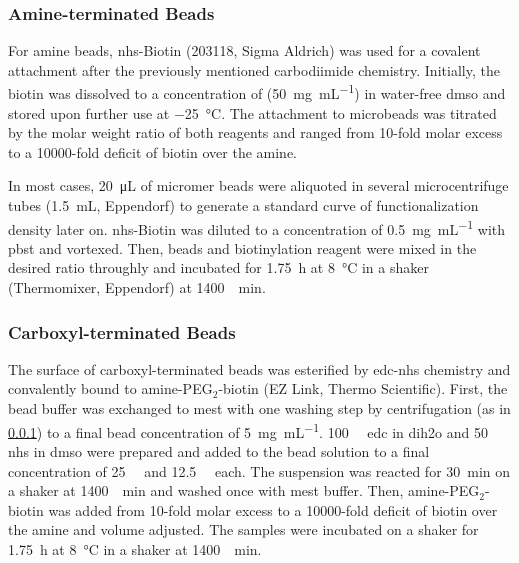 \subsubsection{Amine-terminated Beads} \label{sec:meth:aminebeads}
For \gls{amine} beads, \gls{nhs}-Biotin (203118, Sigma Aldrich) was used for a covalent attachment after the previously mentioned carbodiimide chemistry. Initially, the biotin was dissolved to a concentration of (\SI{50}{\milli\gram\per\milli\liter}) in water-free \gls{dmso} and stored upon further use at \SI{-25}{\degreeCelsius}. The attachment to microbeads was titrated by the molar weight ratio of both reagents and ranged from 10-fold molar excess to a \num{10000}-fold deficit of biotin over the amine. 

In most cases, \SI{20}{\micro\liter} of micromer beads were aliquoted in several microcentrifuge tubes (\SI{1.5}{\milli\liter}, Eppendorf) to generate a standard curve of functionalization density later on. \gls{nhs}-Biotin was diluted to a concentration of \SI{0.5}{\milli\gram\per\milli\liter} with \gls{pbst} and vortexed. Then, beads and biotinylation reagent were mixed in the desired ratio throughly and incubated for \SI{1.75}{\hour} at \SI{8}{\degreeCelsius} in a shaker (Thermomixer, Eppendorf) at \SI{1400}{\per\minute}.

\subsubsection{Carboxyl-terminated Beads}
The surface of \gls{carboxyl}-terminated beads was esterified by \gls{edc}-\gls{nhs} chemistry and convalently bound to amine-PEG$_\mathrm{2}$-biotin (EZ Link, Thermo Scientific). First, the bead buffer was exchanged to \gls{mest} with one washing step by centrifugation (as in \ref{sec:meth:aminebeads}) to a final bead concentration of \SI{5}{\milli\gram\per\milli\liter}. \SI{100}{\milli\molar} \gls{edc} in \gls{dih2o} and \SI{50}{\milli\molar} \gls{nhs} in \gls{dmso} were prepared and added to the bead solution to a final concentration of \SI{25}{\milli\molar} and \SI{12.5}{\milli\molar} each. The suspension was reacted for \SI{30}{\minute} on a shaker at \SI{1400}{\per\minute} and washed once with \gls{mest} buffer. Then,  amine-PEG$_\mathrm{2}$-biotin was added from 10-fold molar excess to a \num{10000}-fold deficit of biotin over the amine and volume adjusted. The samples were incubated on a shaker for \SI{1.75}{\hour} at \SI{8}{\degreeCelsius} in a shaker at \SI{1400}{\per\minute}.

